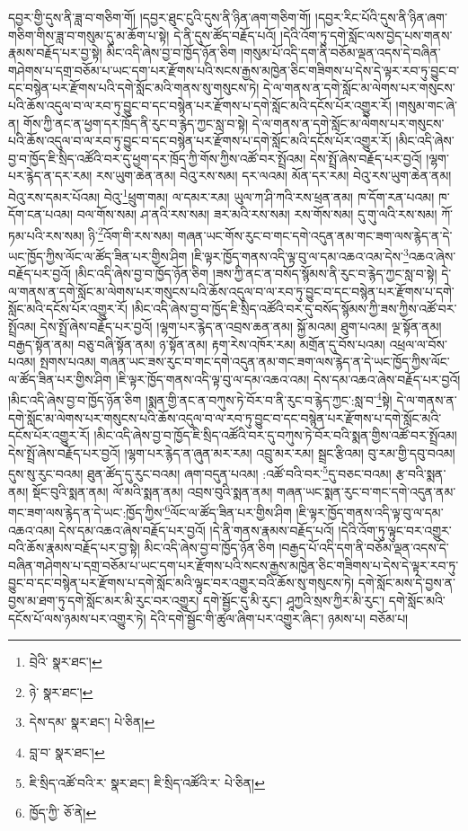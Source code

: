 དབྱར་གྱི་དུས་ནི་ཟླ་བ་གཅིག་གོ། །དབྱར་ཐུང་ངུའི་དུས་ནི་ཉིན་ཞག་གཅིག་གོ། །དབྱར་རིང་པོའི་དུས་ནི་ཉིན་ཞག་གཅིག་གིས་ཟླ་བ་གསུམ་དུ་མ་ཆོག་པ་སྟེ། དེ་ནི་དུས་ཚོད་བརྗོད་པའོ། །དེའི་འོག་ཏུ་དགེ་སློང་ལས་བྱེད་པས་གནས་རྣམས་བརྗོད་པར་བྱ་སྟེ། མིང་འདི་ཞེས་བྱ་བ་ཁྱོད་ཉོན་ཅིག །གསུམ་པོ་འདི་དག་ནི་བཅོམ་ལྡན་འདས་དེ་བཞིན་གཤེགས་པ་དགྲ་བཅོམ་པ་ཡང་དག་པར་རྫོགས་པའི་སངས་རྒྱས་མཁྱེན་ཅིང་གཟིགས་པ་དེས་དེ་ལྟར་རབ་ཏུ་བྱུང་བ་དང་བསྙེན་པར་རྫོགས་པའི་དགེ་སློང་མའི་གནས་སུ་གསུངས་ཏེ། དེ་ལ་གནས་ན་དགེ་སློང་མ་ལེགས་པར་གསུངས་པའི་ཆོས་འདུལ་བ་ལ་རབ་ཏུ་བྱུང་བ་དང་བསྙེན་པར་རྫོགས་པ་དགེ་སློང་མའི་དངོས་པོར་འགྱུར་རོ། །གསུམ་གང་ཞེ་ན། གོས་ཀྱི་ནང་ན་ཕྱག་དར་ཁྲོད་ནི་རུང་བ་རྙེད་ཀྱང་སླ་བ་སྟེ། དེ་ལ་གནས་ན་དགེ་སློང་མ་ལེགས་པར་གསུངས་པའི་ཆོས་འདུལ་བ་ལ་རབ་ཏུ་བྱུང་བ་དང་བསྙེན་པར་རྫོགས་པ་དགེ་སློང་མའི་དངོས་པོར་འགྱུར་རོ། །མིང་འདི་ཞེས་བྱ་བ་ཁྱོད་ཇི་སྲིད་འཚོའི་བར་དུ་ཕྱག་དར་ཁྲོད་ཀྱི་གོས་ཀྱིས་འཚོ་བར་སྤྲོའམ། དེས་སྤྲོ་ཞེས་བརྗོད་པར་བྱའོ། །ལྷག་པར་རྙེད་ན་དར་རམ། རས་ཡུག་ཆེན་ནམ། བེའུ་རས་སམ། དར་ལའམ། མོན་དར་རམ། བེའུ་རས་ཡུག་ཆེན་ནམ། བེའུ་རས་དམར་པོའམ། བེའུ་\footnote{བྲེའི་  སྣར་ཐང་། }ཕྲུག་གམ། ལ་དམར་རམ། ཡུལ་ཀ་ཤི་ཀའི་རས་ཕྲན་ནམ། ཁ་དོག་རན་པའམ། ཁ་དོག་ངན་པའམ། བལ་གོས་སམ། ཤ་ནའི་རས་སམ། ཟར་མའི་རས་སམ། རས་གོས་སམ། དུ་གུ་ལའི་རས་སམ། ཀོ་ཏམ་པའི་རས་སམ། ཉི་\footnote{ཉེ་  སྣར་ཐང་། }འོག་གི་རས་སམ། གཞན་ཡང་གོས་རུང་བ་གང་དགེ་འདུན་ནམ་གང་ཟག་ལས་རྙེད་ན་དེ་ཡང་ཁྱོད་ཀྱིས་ལོང་ལ་ཚོད་ཟིན་པར་གྱིས་ཤིག །ཇི་ལྟར་ཁྱོད་གནས་འདི་ལྟ་བུ་ལ་དམ་འཆའ་འམ་དེས་\footnote{དེས་དམ་  སྣར་ཐང་།  པེ་ཅིན། }འཆའ་ཞེས་བརྗོད་པར་བྱའོ། །མིང་འདི་ཞེས་བྱ་བ་ཁྱོད་ཉོན་ཅིག །ཟས་ཀྱི་ནང་ན་བསོད་སྙོམས་ནི་རུང་བ་རྙེད་ཀྱང་སླ་བ་སྟེ། དེ་ལ་གནས་ན་དགེ་སློང་མ་ལེགས་པར་གསུངས་པའི་ཆོས་འདུལ་བ་ལ་རབ་ཏུ་བྱུང་བ་དང་བསྙེན་པར་རྫོགས་པ་དགེ་སློང་མའི་དངོས་པོར་འགྱུར་རོ། །མིང་འདི་ཞེས་བྱ་བ་ཁྱོད་ཇི་སྲིད་འཚོའི་བར་དུ་བསོད་སྙོམས་ཀྱི་ཟས་ཀྱིས་འཚོ་བར་སྤྲོའམ། དེས་སྤྲོ་ཞེས་བརྗོད་པར་བྱའོ། །ལྷག་པར་རྙེད་ན་འབྲས་ཆན་ནམ། སྐྱོ་མའམ། ཐུག་པའམ། ལྔ་སྟོན་ནམ། བརྒྱད་སྟོན་ནམ། བཅུ་བཞི་སྟོན་ནམ། ཉ་སྟོན་ནམ། རྟག་རེས་འཁོར་རམ། མགྲོན་དུ་བོས་པའམ། འཕྲལ་ལ་བོས་པའམ། སྤགས་པའམ། གཞན་ཡང་ཟས་རུང་བ་གང་དགེ་འདུན་ནམ་གང་ཟག་ལས་རྙེད་ན་དེ་ཡང་ཁྱོད་ཀྱིས་ལོང་ལ་ཚོད་ཟིན་པར་གྱིས་ཤིག །ཇི་ལྟར་ཁྱོད་གནས་འདི་ལྟ་བུ་ལ་དམ་འཆའ་འམ། དེས་དམ་འཆའ་ཞེས་བརྗོད་པར་བྱའོ། །མིང་འདི་ཞེས་བྱ་བ་ཁྱོད་ཉོན་ཅིག །སྨན་གྱི་ནང་ན་བཀུས་ཏེ་བོར་བ་ནི་རུང་བ་རྙེད་ཀྱང་:སླ་བ་\footnote{བླ་བ་  སྣར་ཐང་། }སྟེ། དེ་ལ་གནས་ན་དགེ་སློང་མ་ལེགས་པར་གསུངས་པའི་ཆོས་འདུལ་བ་ལ་རབ་ཏུ་བྱུང་བ་དང་བསྙེན་པར་རྫོགས་པ་དགེ་སློང་མའི་དངོས་པོར་འགྱུར་རོ། །མིང་འདི་ཞེས་བྱ་བ་ཁྱོད་ཇི་སྲིད་འཚོའི་བར་དུ་བཀུས་ཏེ་བོར་བའི་སྨན་གྱིས་འཚོ་བར་སྤྲོའམ། དེས་སྤྲོ་ཞེས་བརྗོད་པར་བྱའོ། །ལྷག་པར་རྙེད་ན་ཞུན་མར་རམ། འབྲུ་མར་རམ། སྦྲང་རྩིའམ། བུ་རམ་གྱི་དབུ་བའམ། དུས་སུ་རུང་བའམ། ཐུན་ཚོད་དུ་རུང་བའམ། ཞག་བདུན་པའམ། :འཚོ་བའི་བར་\footnote{ཇི་སྲིད་འཚོ་བའི་ར་  སྣར་ཐང་། ཇི་སྲིད་འཚོའི་ར་  པེ་ཅིན། }དུ་བཅང་བའམ། རྩ་བའི་སྨན་ནམ། སྡོང་བུའི་སྨན་ནམ། ལོ་མའི་སྨན་ནམ། འབྲས་བུའི་སྨན་ནམ། གཞན་ཡང་སྨན་རུང་བ་གང་དགེ་འདུན་ནམ་གང་ཟག་ལས་རྙེད་ན་དེ་ཡང་:ཁྱོད་ཀྱིས་\footnote{ཁྱོད་ཀྱི་  ཅོ་ནེ། }ལོང་ལ་ཚོད་ཟིན་པར་གྱིས་ཤིག །ཇི་ལྟར་ཁྱོད་གནས་འདི་ལྟ་བུ་ལ་དམ་འཆའ་འམ། དེས་དམ་འཆའ་ཞེས་བརྗོད་པར་བྱའོ། །དེ་ནི་གནས་རྣམས་བརྗོད་པའོ། །དེའི་འོག་ཏུ་ལྟུང་བར་འགྱུར་བའི་ཆོས་རྣམས་བརྗོད་པར་བྱ་སྟེ། མིང་འདི་ཞེས་བྱ་བ་ཁྱོད་ཉོན་ཅིག །བརྒྱད་པོ་འདི་དག་ནི་བཅོམ་ལྡན་འདས་དེ་བཞིན་གཤེགས་པ་དགྲ་བཅོམ་པ་ཡང་དག་པར་རྫོགས་པའི་སངས་རྒྱས་མཁྱེན་ཅིང་གཟིགས་པ་དེས་དེ་ལྟར་རབ་ཏུ་བྱུང་བ་དང་བསྙེན་པར་རྫོགས་པ་དགེ་སློང་མའི་ལྟུང་བར་འགྱུར་བའི་ཆོས་སུ་གསུངས་ཏེ། དགེ་སློང་མས་དེ་བྱས་ན་བྱས་མ་ཐག་ཏུ་དགེ་སློང་མར་མི་རུང་བར་འགྱུར། དགེ་སྦྱོང་དུ་མི་རུང་། ཤཱཀྱའི་སྲས་ཀྱིར་མི་རུང་། དགེ་སློང་མའི་དངོས་པོ་ལས་ཉམས་པར་འགྱུར་ཏེ། དེའི་དགེ་སྦྱོང་གི་ཚུལ་ཞིག་པར་འགྱུར་ཞིང་། ཉམས་པ། བཅོམ་པ། 